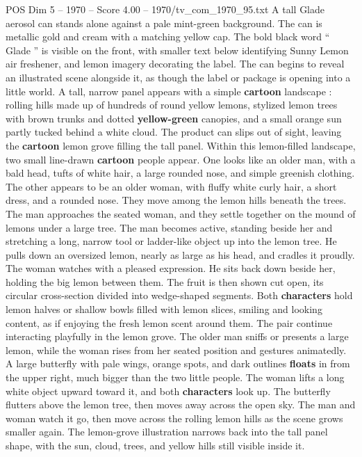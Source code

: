 \begin{textsample}{POS Dim 5 – 1970 – Score 4.00 – 1970/tv\_com\_1970\_95.txt}  \label{ex:f5_pos_090}
A tall Glade aerosol can stands alone against a pale mint-green background.
The can is metallic gold and cream with a matching yellow cap.
The bold black word “ Glade ” is visible on the front, with smaller text below identifying Sunny Lemon air freshener, and lemon imagery decorating the label.
The can begins to reveal an illustrated scene alongside it, as though the label or package is opening into a little world.
A tall, narrow panel appears with a simple \textbf{cartoon} landscape : rolling hills made up of hundreds of round yellow lemons, stylized lemon trees with brown trunks and dotted \textbf{yellow-green} canopies, and a small orange sun partly tucked behind a white cloud.
The product can slips out of sight, leaving the \textbf{cartoon} lemon grove filling the tall panel.
Within this lemon-filled landscape, two small line-drawn \textbf{cartoon} people appear.
One looks like an older man, with a bald head, tufts of white hair, a large rounded nose, and simple greenish clothing.
The other appears to be an older woman, with fluffy white curly hair, a short dress, and a rounded nose.
They move among the lemon hills beneath the trees.
The man approaches the seated woman, and they settle together on the mound of lemons under a large tree.
The man becomes active, standing beside her and stretching a long, narrow tool or ladder-like object up into the lemon tree.
He pulls down an oversized lemon, nearly as large as his head, and cradles it proudly.
The woman watches with a pleased expression.
He sits back down beside her, holding the big lemon between them.
The fruit is then shown cut open, its circular cross-section divided into wedge-shaped segments.
Both \textbf{characters} hold lemon halves or shallow bowls filled with lemon slices, smiling and looking content, as if enjoying the fresh lemon scent around them.
The pair continue interacting playfully in the lemon grove.
The older man sniffs or presents a large lemon, while the woman rises from her seated position and gestures animatedly.
A large butterfly with pale wings, orange spots, and dark outlines \textbf{floats} in from the upper right, much bigger than the two little people.
The woman lifts a long white object upward toward it, and both \textbf{characters} look up.
The butterfly flutters above the lemon tree, then moves away across the open sky.
The man and woman watch it go, then move across the rolling lemon hills as the scene grows smaller again.
The lemon-grove illustration narrows back into the tall panel shape, with the sun, cloud, trees, and yellow hills still visible inside it.

\end{textsample}
